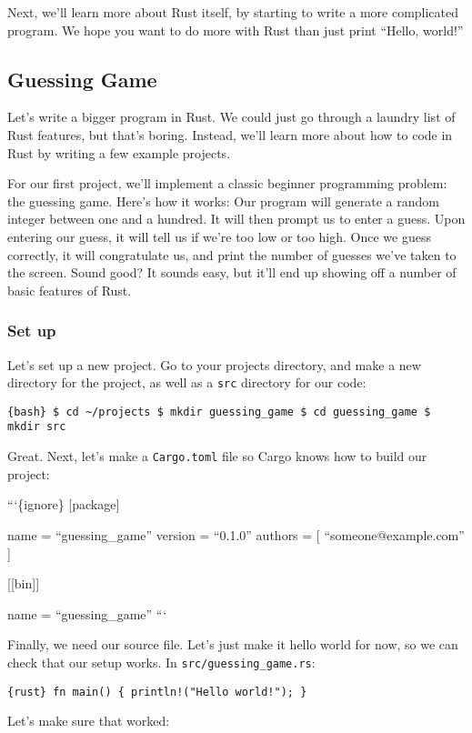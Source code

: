 \documentclass[]{article}
\begin{document}
Next, we'll learn more about Rust itself, by starting to write a more
complicated program. We hope you want to do more with Rust than just
print ``Hello, world!''

\subsection{Guessing Game}\label{guessing-game}

Let's write a bigger program in Rust. We could just go through a laundry
list of Rust features, but that's boring. Instead, we'll learn more
about how to code in Rust by writing a few example projects.

For our first project, we'll implement a classic beginner programming
problem: the guessing game. Here's how it works: Our program will
generate a random integer between one and a hundred. It will then prompt
us to enter a guess. Upon entering our guess, it will tell us if we're
too low or too high. Once we guess correctly, it will congratulate us,
and print the number of guesses we've taken to the screen. Sound good?
It sounds easy, but it'll end up showing off a number of basic features
of Rust.

\subsubsection{Set up}\label{set-up}

Let's set up a new project. Go to your projects directory, and make a
new directory for the project, as well as a \texttt{src} directory for
our code:

\texttt{\{bash\} \$ cd \textasciitilde{}/projects \$ mkdir guessing\_game \$ cd guessing\_game \$ mkdir src}

Great. Next, let's make a \texttt{Cargo.toml} file so Cargo knows how to
build our project:

```\{ignore\} {[}package{]}

name = ``guessing\_game'' version = ``0.1.0'' authors = {[}
``someone@example.com'' {]}

{[}{[}bin{]}{]}

name = ``guessing\_game'' ```

Finally, we need our source file. Let's just make it hello world for
now, so we can check that our setup works. In
\texttt{src/guessing\_game.rs}:

\texttt{\{rust\} fn main() \{     println!("Hello world!"); \}}

Let's make sure that worked:
\end{document}
